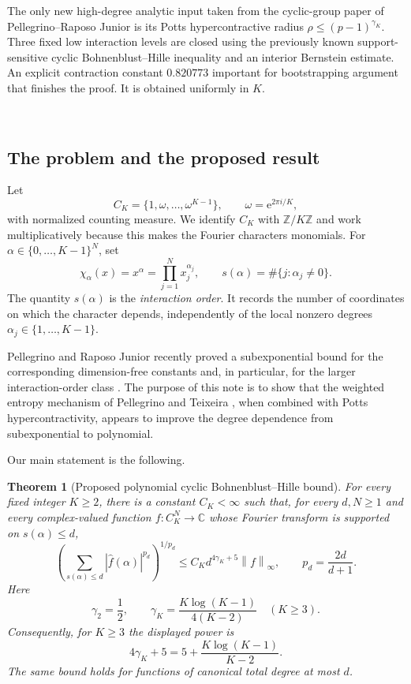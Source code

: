 \documentclass[11pt]{article}
\newtheorem{theorem}{Theorem}[section]
\theoremstyle{definition}
\theoremstyle{remark}
\newcommand{\C}{\mathbb{C}}
\newcommand{\Z}{\mathbb{Z}}
\newcommand{\wh}{\widehat}
\newcommand{\norm}[1]{\left\lVert #1\right\rVert}
\newcommand{\abs}[1]{\left\lvert #1\right\rvert}
\newcommand{\e}{\mathrm{e}}
\begin{document}
\medskip

The only new
high-degree analytic input taken from the cyclic-group paper of
Pellegrino--Raposo Junior  \cite{PellegrinoRaposo} is its Potts hypercontractive radius
$\rho\le(p-1)^{\gamma_K}$.  Three fixed low interaction levels are closed
using the previously known support-sensitive cyclic Bohnenblust--Hille
inequality and an interior Bernstein estimate.  An explicit contraction
constant $0.820773$ important for bootstrapping argument that finishes the proof. It   is obtained uniformly in $K$.


\

\subsection{The problem and the proposed result}

Let
\[
 C_K=\{1,\omega,\ldots,\omega^{K-1}\},
 \qquad \omega=\e^{2\pi i/K},
\]
with normalized counting measure.  We identify $C_K$ with $\Z/K\Z$ and work
multiplicatively because this makes the Fourier characters monomials.
For $\alpha\in\{0,\ldots,K-1\}^N$, set
\[
 \chi_\alpha(x)=x^\alpha=\prod_{j=1}^N x_j^{\alpha_j},
 \qquad
 s(\alpha)=\#\{j:\alpha_j\ne0\}.
\]
The quantity $s(\alpha)$ is the \emph{interaction order}.  It records the
number of coordinates on which the character depends, independently of the
local nonzero degrees $\alpha_j\in\{1,\ldots,K-1\}$.

Pellegrino and Raposo Junior recently proved a subexponential bound for the
corresponding dimension-free constants and, in particular, for the larger
interaction-order class \cite{PellegrinoRaposo}.  The purpose of this note is
to show that the weighted entropy mechanism of Pellegrino and Teixeira
\cite{PellegrinoTeixeira}, when combined with Potts hypercontractivity, appears
to improve the degree dependence from subexponential to polynomial.

Our main statement is the following.

\begin{theorem}[Proposed polynomial cyclic Bohnenblust--Hille bound]
\label{thm:main-intro}
For every fixed integer $K\ge2$, there is a constant $C_K<\infty$ such that,
for every $d,N\ge1$ and every complex-valued function
$f:C_K^N\to\C$ whose Fourier transform is supported on
$s(\alpha)\le d$,
\begin{equation}
\label{eq:int-main-intro}
 \left(
  \sum_{s(\alpha)\le d}
  \abs{\wh f(\alpha)}^{p_d}
 \right)^{1/p_d}
 \le C_K d^{4\gamma_K+5}\norm f_\infty,
 \qquad
 p_d=\frac{2d}{d+1}.
\end{equation}
Here
\begin{equation}
\label{eq:gamma-intro}
 \gamma_2=\frac12,
 \qquad
 \gamma_K=\frac{K\log(K-1)}{4(K-2)}\quad(K\ge3).
\end{equation}
Consequently, for $K\ge3$ the displayed power is
\begin{equation}
\label{eq:power-explicit}
 4\gamma_K+5
 =5+\frac{K\log(K-1)}{K-2}.
\end{equation}
The same bound holds for functions of canonical total degree at most $d$.
\end{theorem}
\end{document}
